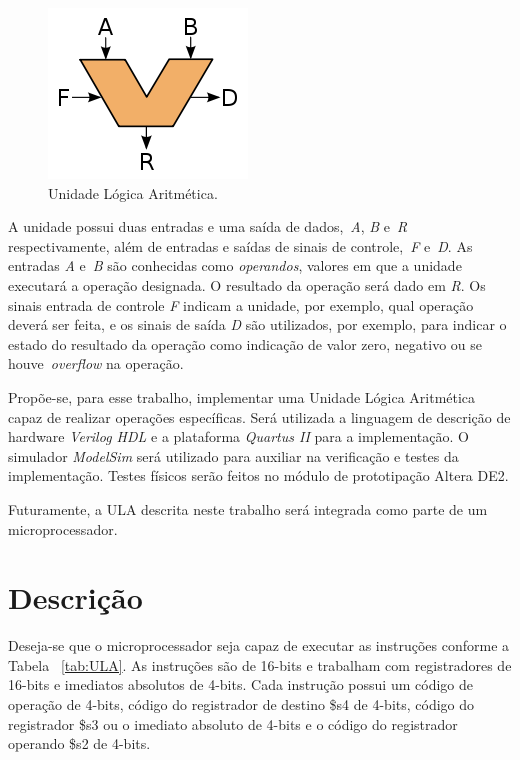 \documentclass[11pt,a4paper,titlepage]{article}
\begin{document}
\begin{figure}[h]
\centering
\includegraphics[scale=0.8]{images/ALU_symbol.png}
\caption{Unidade Lógica Aritmética.}
\label{fig:ula}
\end{figure}

A unidade possui duas entradas e uma saída de dados,~\textit{A}, \textit{B} e~\textit{R} respectivamente, além de entradas e saídas de sinais de controle,~\textit{F} e~\textit{D}. As entradas \textit{A} e~\textit{B} são conhecidas como \textit{operandos}, valores em que a unidade executará a operação designada. O resultado da operação será dado em \textit{R}. Os sinais entrada de controle \textit{F} indicam a unidade, por exemplo, qual operação deverá ser feita, e os sinais de saída \textit{D} são utilizados, por exemplo, para indicar o estado do resultado da operação como indicação de valor zero, negativo ou se houve~\textit{overflow} na operação.

Propõe-se, para esse trabalho, implementar uma Unidade Lógica Aritmética capaz de realizar operações específicas. Será utilizada a linguagem de descrição de hardware \textit{Verilog HDL} e a plataforma \textit{Quartus II} para a implementação. O simulador \textit{ModelSim} será utilizado para auxiliar na verificação e testes da implementação. Testes físicos serão feitos no módulo de prototipação Altera DE2.

Futuramente, a ULA descrita neste trabalho será integrada como parte de um microprocessador.

\section{Descrição}\label{sec:desc}

Deseja-se que o microprocessador seja capaz de executar as instruções conforme a Tabela ~\ref{tab:ULA}. As instruções são de 16-bits e trabalham com registradores de 16-bits e imediatos absolutos de 4-bits. Cada instrução possui um código de operação de 4-bits, código do registrador de destino \$s4 de 4-bits, código do registrador \$s3 ou o imediato absoluto de 4-bits e o código do registrador operando \$s2 de 4-bits.
\end{document}
